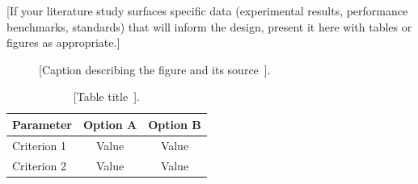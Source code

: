 [If your literature study surfaces specific data (experimental
results, performance benchmarks, standards) that will inform the
design, present it here with tables or figures as appropriate.]

\begin{figure}[H]
    \centering
    \caption{[Caption describing the figure and its source~\cite{example_ref}].}
    \label{fig:lit-example}
\end{figure}

\begin{table}[H]
    \centering
    \caption{[Table title~\cite{example_ref}].}
    \label{tab:lit-example}
    \begin{tabular}{@{} l c c @{}}
        \toprule
        \textbf{Parameter} & \textbf{Option A} & \textbf{Option B} \\
        \midrule
        Criterion 1 & Value & Value \\
        Criterion 2 & Value & Value \\
        \bottomrule
    \end{tabular}
\end{table}
